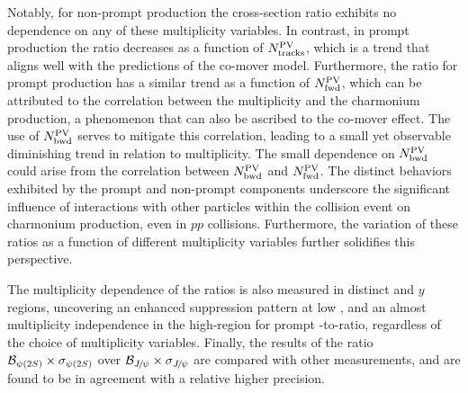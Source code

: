 \documentclass[12pt,a4paper]{article}
\begin{document}
Notably, for non-prompt production the cross-section ratio exhibits no dependence on any of these multiplicity variables. In contrast, in prompt production the ratio decreases as a function of $N_{\rm tracks}^{\rm PV}$, which is a trend that aligns well with the predictions of the co-mover model. Furthermore, the ratio for prompt production has a similar trend as a function of $N_{\rm fwd}^{\rm PV}$, which can be attributed to the correlation between the multiplicity and the charmonium production, a phenomenon that can also be ascribed to the co-mover effect. The use of $N_{\rm bwd}^{\rm PV}$ serves to mitigate this correlation, leading to a small yet observable diminishing trend in relation to multiplicity. The small dependence on $N_{\rm bwd}^{\rm PV}$ could arise from the correlation between $N_{\rm bwd}^{\rm PV}$ and $N_{\rm fwd}^{\rm PV}$. The distinct behaviors exhibited by the prompt and non-prompt components underscore the significant influence of interactions with other particles within the collision event on charmonium production, even in $pp$ collisions. Furthermore, the variation of these ratios as a function of different multiplicity variables further solidifies this perspective. 

The multiplicity dependence of the ratios is also measured in distinct \pt and $y$ regions, uncovering an enhanced suppression pattern at low \pt, and an almost multiplicity independence in the high-\pt region for prompt \psitwos-to-\jpsi ratio, regardless of the choice of multiplicity variables. Finally, the results of the ratio ${\mathcal{B}}_{{\psi{(2S)}}} \times \sigma_{{\psi{(2S)}}}$ over ${\mathcal{B}}_{{{J\mskip -3mu/\mskip -2mu\psi}}} \times \sigma_{{{J\mskip -3mu/\mskip -2mu\psi}}}$ are compared with other measurements, and are found to be in agreement with a relative higher precision.


\end{document}
